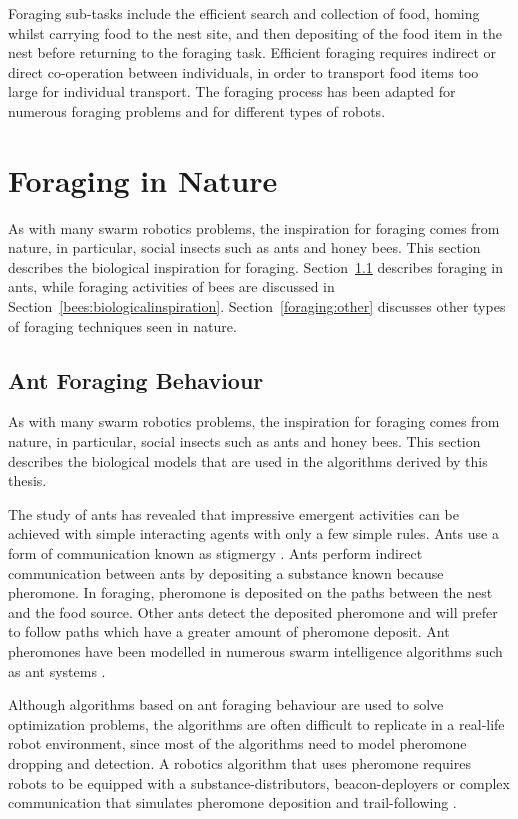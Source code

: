 Foraging sub-tasks include the efficient search and collection of food, homing whilst carrying food to the nest site, and then depositing of the food item in the nest before returning to the foraging task. Efficient foraging requires indirect or direct co-operation between individuals, in order to transport food items too large for individual transport. The foraging process has been adapted for numerous foraging problems and for different types of robots.


\section{Foraging in Nature}
\label{foraginginnature}
As with many swarm robotics problems, the inspiration for foraging comes from nature, in particular, social insects such as ants and honey bees. This section describes the biological inspiration for foraging. Section~\ref{biological:ants} describes foraging in ants, while foraging activities of bees are discussed in Section~\ref{bees:biologicalinspiration}. Section~\ref{foraging:other} discusses other types of foraging techniques seen in nature.


\subsection{Ant Foraging Behaviour}
\label{biological:ants}
As with many swarm robotics problems, the inspiration for foraging comes from nature, in particular, social insects such as ants and honey bees. This section describes the biological models that are used in the algorithms derived by this thesis. 

The study of ants has revealed that impressive emergent activities can be achieved with simple interacting agents with only a few simple rules. Ants use a form of communication known as stigmergy \cite{dorigo2000ant}. Ants perform indirect communication between ants by depositing a substance known because pheromone. In foraging, pheromone is deposited on the paths between the nest and the food source. Other ants detect the deposited pheromone and will prefer to follow paths which have a greater amount of pheromone deposit. Ant pheromones have been modelled in numerous swarm intelligence algorithms such as ant systems \cite{dorigo2006ant, dorigo2010ant}. 
 
Although algorithms based on ant foraging behaviour are used to solve optimization problems, the algorithms are often difficult to replicate in a real-life robot environment, since most of the algorithms need to model pheromone dropping and detection. A robotics algorithm that uses pheromone requires robots to be equipped with a substance-distributors, beacon-deployers or complex communication that simulates pheromone deposition and trail-following \cite{hoff2010two}.

